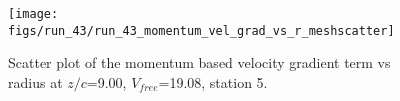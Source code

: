 \begin{figure}[H]
\centering
\texttt{[image: figs/run\_43/run\_43\_momentum\_vel\_grad\_vs\_r\_meshscatter]}
\caption{Scatter plot of the momentum based velocity gradient term vs radius at $z/c$=9.00, $V_{free}$=19.08, station 5.}
\label{fig:run_43_momentum_vel_grad_vs_r_meshscatter}
\end{figure}


